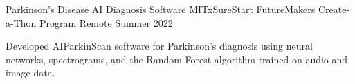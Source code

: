 \documentclass[10pt, letterpaper]{article}
\begin{document}
\begin{projectentry}
  {\href{https://github.com/agopalareddy/AIPS}{Parkinson's Disease AI Diagnosis Software}} %
  {MITxSureStart FutureMakers Create-a-Thon Program} %
  {Remote} %
  {Summer 2022} %
  \item Developed AIParkinScan software for Parkinson's diagnosis using neural networks, spectrograms, and the Random Forest algorithm trained on audio and image data.
\end{projectentry}

\end{document}
